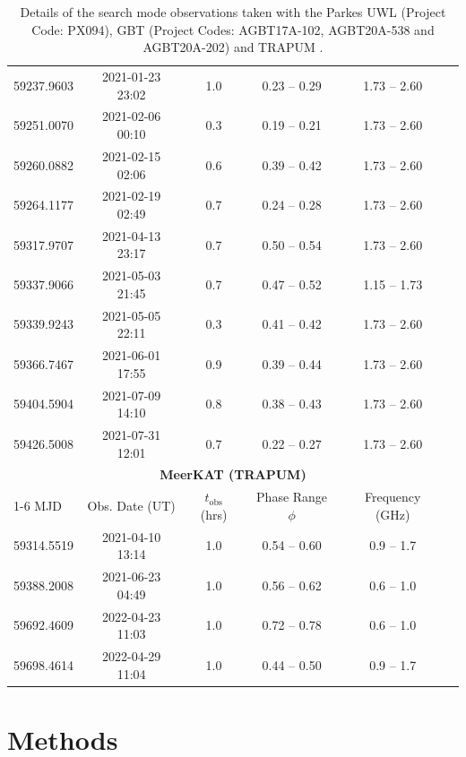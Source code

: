 \begin{table}
\begin{tabular}{lccccc}
        59237.9603 & 2021-01-23 23:02 & 1.0 & 0.23 -- 0.29 & 1.73 -- 2.60 \\
        59251.0070 & 2021-02-06 00:10 & 0.3 & 0.19 -- 0.21 & 1.73 -- 2.60 \\
        59260.0882 & 2021-02-15 02:06 & 0.6 & 0.39 -- 0.42 & 1.73 -- 2.60 \\
        59264.1177 & 2021-02-19 02:49 & 0.7 & 0.24 -- 0.28 & 1.73 -- 2.60 \\
        59317.9707 & 2021-04-13 23:17 & 0.7 & 0.50 -- 0.54 & 1.73 -- 2.60 \\
        59337.9066 & 2021-05-03 21:45 & 0.7 & 0.47 -- 0.52 & 1.15 -- 1.73 \\
        59339.9243 & 2021-05-05 22:11 & 0.3 & 0.41 -- 0.42 & 1.73 -- 2.60 \\
        59366.7467 & 2021-06-01 17:55 & 0.9 & 0.39 -- 0.44 & 1.73 -- 2.60 \\
        59404.5904 & 2021-07-09 14:10 & 0.8 & 0.38 -- 0.43 & 1.73 -- 2.60 \\
        59426.5008 & 2021-07-31 12:01 & 0.7 & 0.22 -- 0.27 & 1.73 -- 2.60 \\
        \midrule
        \multicolumn{6}{c}{\textbf{MeerKAT (TRAPUM)}} \\
        \cmidrule(r){1-6}
        MJD & Obs. Date (UT) & $t_{\text{obs}}$ (hrs) & Phase Range $\phi$ & Frequency (GHz) & \\
        \midrule
        59314.5519 & 2021-04-10 13:14 & 1.0 & 0.54 -- 0.60 & 0.9 -- 1.7 \\
        59388.2008 & 2021-06-23 04:49 & 1.0 & 0.56 -- 0.62 & 0.6 -- 1.0 \\
        59692.4609 & 2022-04-23 11:03 & 1.0 & 0.72 -- 0.78 & 0.6 -- 1.0 \\
        59698.4614 & 2022-04-29 11:04 & 1.0 & 0.44 -- 0.50 & 0.9 -- 1.7 \\
        \bottomrule
    \end{tabular}
    \caption[Details of J0523 observations]{Details of the search mode observations taken with the Parkes UWL (Project Code: PX094), GBT (Project Codes: AGBT17A-102, AGBT20A-538 and AGBT20A-202) and  TRAPUM \citep{thongmeearkom_targeted_2024}.}
    \label{tab:combined_observations}
\end{table}


\section{Methods} \label{sec:methods}

